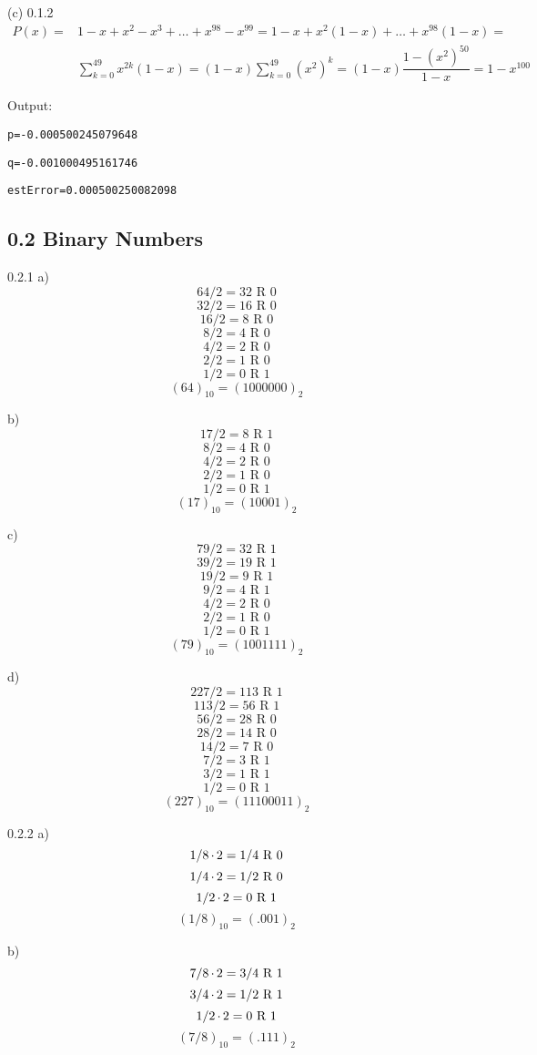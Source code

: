 \begin{task}{(c) 0.1.2}
\begin{align*}
P(x)=&
1-x+x^2-x^3+\ldots+x^{98}-x^{99}=
1-x+x^2(1-x)+\ldots+x^{98}(1-x)= \\
&\sum_{k=0}^{49}x^{2k}(1-x)=
(1-x)\sum_{k=0}^{49}(x^2)^k=
(1-x)\dfrac{1-(x^2)^{50}}{1-x}=
1-x^{100}
\end{align*}

Output:

\texttt{p=-0.000500245079648}

\texttt{q=-0.001000495161746}

\texttt{estError=0.000500250082098}

\end{task}

\subsection*{0.2 Binary Numbers}

\begin{task}{0.2.1 a)}
\[64/2=32\text{ R }0\]
\[32/2=16\text{ R }0\]
\[16/2=8\text{ R }0\]
\[8/2=4\text{ R }0\]
\[4/2=2\text{ R }0\]
\[2/2=1\text{ R }0\]
\[1/2=0\text{ R }1\]
\[(64)_{10}=(1000000)_2\]
\end{task}

\begin{task}{b)}
\[17/2=8\text{ R }1\]
\[8/2=4\text{ R }0\]
\[4/2=2\text{ R }0\]
\[2/2=1\text{ R }0\]
\[1/2=0\text{ R }1\]
\[(17)_{10}=(10001)_2\]
\end{task}

\begin{task}{c)}
\[79/2=32\text{ R }1\]
\[39/2=19\text{ R }1\]
\[19/2=9\text{ R }1\]
\[9/2=4\text{ R }1\]
\[4/2=2\text{ R }0\]
\[2/2=1\text{ R }0\]
\[1/2=0\text{ R }1\]
\[(79)_{10}=(1001111)_2\]
\end{task}

\begin{task}{d)}
\[227/2=113\text{ R }1\]
\[113/2=56\text{ R }1\]
\[56/2=28\text{ R }0\]
\[28/2=14\text{ R }0\]
\[14/2=7\text{ R }0\]
\[7/2=3\text{ R }1\]
\[3/2=1\text{ R }1\]
\[1/2=0\text{ R }1\]
\[(227)_{10}=(11100011)_2\]
\end{task}

\begin{task}{0.2.2 a)}
\[1/8\operatorname{\cdot}2=1/4\text{ R }0\]
\[1/4\operatorname{\cdot}2=1/2\text{ R }0\]
\[1/2\operatorname{\cdot}2=0\text{ R }1\]
\[(1/8)_{10}=(.001)_2\]
\end{task}

\begin{task}{b)}
\[7/8\operatorname{\cdot}2=3/4\text{ R }1\]
\[3/4\operatorname{\cdot}2=1/2\text{ R }1\]
\[1/2\operatorname{\cdot}2=0\text{ R }1\]
\[(7/8)_{10}=(.111)_2\]
\end{task}


